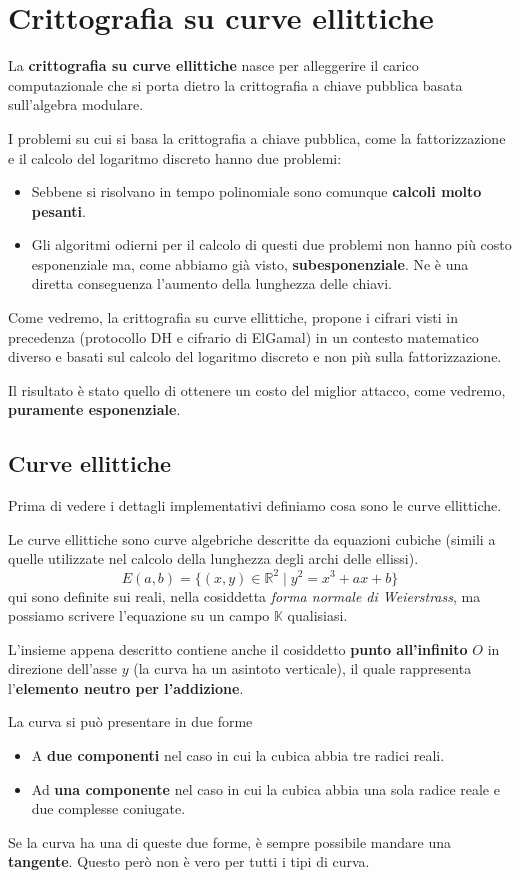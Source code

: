 \chapter{Crittografia su curve ellittiche}
La \textbf{crittografia su curve ellittiche} nasce per alleggerire il carico computazionale che si porta dietro
la crittografia a chiave pubblica basata sull'algebra modulare.

I problemi su cui si basa la crittografia a chiave pubblica, come la fattorizzazione e il calcolo del logaritmo
discreto hanno due problemi:
\begin{itemize}
	\item Sebbene si risolvano in tempo polinomiale sono comunque \textbf{calcoli molto pesanti}.
	\item Gli algoritmi odierni per il calcolo di questi due problemi non hanno pi\`u costo esponenziale ma,
	      come abbiamo gi\`a visto, \textbf{subesponenziale}. Ne \`e una diretta conseguenza l'aumento della
	      lunghezza delle chiavi.
\end{itemize}
Come vedremo, la crittografia su curve ellittiche, propone i cifrari visti in precedenza (protocollo DH e cifrario
di ElGamal) in un contesto matematico diverso e basati sul calcolo del logaritmo discreto e non pi\`u sulla
fattorizzazione.

Il risultato \`e stato quello di ottenere un costo del miglior attacco, come vedremo, \textbf{puramente esponenziale}.

\section{Curve ellittiche}
Prima di vedere i dettagli implementativi definiamo cosa sono le curve ellittiche.

Le curve ellittiche sono curve algebriche descritte da equazioni cubiche (simili a quelle utilizzate nel calcolo
della lunghezza degli archi delle ellissi).
\[ E(a, b) = \{ (x, y) \in \mathbb{R}^2 \mid y^2 = x^3 + ax + b \} \]
qui sono definite sui reali, nella cosiddetta \emph{forma normale di Weierstrass}, ma possiamo scrivere l'equazione
su un campo $\mathbb{K}$ qualisiasi.

L'insieme appena descritto contiene anche il cosiddetto \textbf{punto all'infinito} $O$ in direzione dell'asse $y$
(la curva ha un asintoto verticale), il quale rappresenta l'\textbf{elemento neutro per l'addizione}.

La curva si pu\`o presentare in due forme
\begin{itemize}
	\item A \textbf{due componenti} nel caso in cui la cubica abbia tre radici reali.
	\item Ad \textbf{una componente} nel caso in cui la cubica abbia una sola radice reale e due complesse
	      coniugate.
\end{itemize}
Se la curva ha una di queste due forme, \`e sempre possibile mandare una \textbf{tangente}. Questo per\`o non \`e
vero per tutti i tipi di curva.

